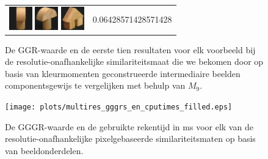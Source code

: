 \begin{figure}[tbp]
\begin{center}
\begin{tabular}{m{11cm} | m{3cm} |}
\includegraphics[width=1cm]{coil/beeld-5.eps}
\includegraphics[width=1cm]{coil/beeld-3.eps}
\includegraphics[width=1cm]{coil/beeld-45.eps}
& {\scriptsize 0.06428571428571428}
\\
\end{tabular}
\caption{\label{fig:results_beste_moments_pixelgeb}De GGR-waarde en de eerste tien resultaten voor elk voorbeeld bij de resolutie-onafhankelijke similariteitsmaat die we bekomen door op basis van kleurmomenten geconstrueerde intermediaire beelden componentsgewijs te vergelijken met behulp van $M_{9}$.}
\end{center}
\end{figure}



\begin{figure}[!t]
\begin{center}
\texttt{[image: plots/multires\_gggrs\_en\_cputimes\_filled.eps]}
\caption{\label{fig:multires_gggrs_en_cputimes}De GGGR-waarde en de gebruikte rekentijd in ms voor elk van de resolutie-onafhankelijke pixelgebaseerde similariteitsmaten op basis van beeldonderdelen.}
\end{center}
\end{figure}

